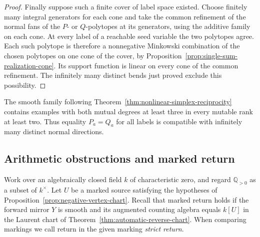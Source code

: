 \documentclass[11pt,reqno]{amsart}
\numberwithin{equation}{section}
\theoremstyle{definition}
\theoremstyle{remark}
\begin{document}
\begin{proof}
Finally suppose such a finite cover of label space existed. Choose
finitely many integral generators for each cone and take the common
refinement of the normal fans of the \(P\)- or \(Q\)-polytopes at
its generators, using the additive family on each cone. At every
label of a reachable seed variable the two polytopes agree.
Each such polytope is therefore a nonnegative Minkowski combination
of the chosen polytopes on one cone of the cover, by
Proposition~\ref{prop:single-sum-realization-cone}. Its support function
is linear on every cone of the common refinement. The infinitely
many distinct bends just proved exclude this possibility.
\end{proof}

The smooth family following Theorem~\ref{thm:nonlinear-simplex-reciprocity}
contains examples with both mutual degrees at least three in every
mutable rank at least two. Thus equality \(P_a=Q_a\) for all labels
is compatible with infinitely many distinct normal directions.

\subsection{Arithmetic obstructions and marked return}

Work over an algebraically closed field \(k\) of characteristic zero,
and regard \(\mathbb Q_{>0}\) as a subset of \(k^\times\).
Let \(U\) be a marked source satisfying the hypotheses
of Proposition~\ref{prop:negative-vertex-chart}. Recall that marked
return holds if the forward mirror \(Y\) is smooth and its augmented
counting algebra equals \(k[U]\) in the Laurent chart of
Theorem~\ref{thm:automatic-reverse-chart}. When comparing markings we
call return in the given marking \emph{strict return}.
\end{document}
